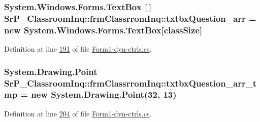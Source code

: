 \hypertarget{class_sr_p___classroom_inq_1_1frm_classrrom_inq_ac8b5f7f10341c6c43066881afcbbcaaa}{
\subsubsection[{txtbx\-Question\-\_\-arr}]{\setlength{\rightskip}{0pt plus 5cm}\-System.\-Windows.\-Forms.\-Text\-Box \mbox{[}$\,$\mbox{]} {\bf \-Sr\-P\-\_\-\-Classroom\-Inq\-::frm\-Classrrom\-Inq\-::txtbx\-Question\-\_\-arr} = new \-System.\-Windows.\-Forms.\-Text\-Box\mbox{[}{\bf class\-Size}\mbox{]}}}
\label{class_sr_p___classroom_inq_1_1frm_classrrom_inq_ac8b5f7f10341c6c43066881afcbbcaaa}


\-Definition at line \hyperlink{_form1-dyn-ctrls_8cs_source_l00191}{191} of file \hyperlink{_form1-dyn-ctrls_8cs_source}{\-Form1-\/dyn-\/ctrls.\-cs}.

\hypertarget{class_sr_p___classroom_inq_1_1frm_classrrom_inq_a09f25b6934ed463e8b781498b5511796}{
\subsubsection[{txtbx\-Question\-\_\-arr\-\_\-tmp}]{\setlength{\rightskip}{0pt plus 5cm}\-System.\-Drawing.\-Point {\bf \-Sr\-P\-\_\-\-Classroom\-Inq\-::frm\-Classrrom\-Inq\-::txtbx\-Question\-\_\-arr\-\_\-tmp} = new \-System.\-Drawing.\-Point(32, 13)}}
\label{class_sr_p___classroom_inq_1_1frm_classrrom_inq_a09f25b6934ed463e8b781498b5511796}


\-Definition at line \hyperlink{_form1-dyn-ctrls_8cs_source_l00204}{204} of file \hyperlink{_form1-dyn-ctrls_8cs_source}{\-Form1-\/dyn-\/ctrls.\-cs}.

